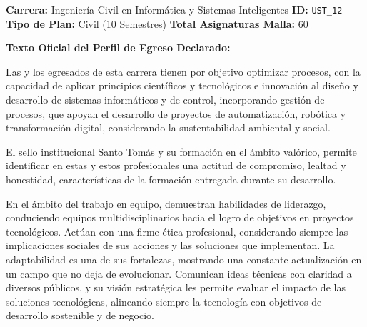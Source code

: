 \documentclass[11pt,a4paper]{article}
\begin{document}
\begin{tcolorbox}[fichaStyle, title={UNIVERSIDAD 12: Universidad Santo Tomás (UST)}]
\small\sffamily
\textbf{Carrera:} Ingeniería Civil en Informática y Sistemas Inteligentes \hfill \textbf{ID:} \texttt{UST\_12} \\
\textbf{Tipo de Plan:} Civil (10 Semestres) \hfill \textbf{Total Asignaturas Malla:} 60

\tcbline

\textbf{Texto Oficial del Perfil de Egreso Declarado:}\\[4pt]
{\small\rmfamily
Las y los egresados de esta carrera tienen por objetivo optimizar procesos, con la capacidad de aplicar principios científicos y tecnológicos e innovación al diseño y desarrollo de sistemas informáticos y de control, incorporando gestión de procesos, que apoyan el desarrollo de proyectos de automatización, robótica y transformación digital, considerando la sustentabilidad ambiental y social.

\vspace{4pt}
El sello institucional Santo Tomás y su formación en el ámbito valórico, permite identificar en estas y estos profesionales una actitud de compromiso, lealtad y honestidad, características de la formación entregada durante su desarrollo.

\vspace{4pt}
En el ámbito del trabajo en equipo, demuestran habilidades de liderazgo, conduciendo equipos multidisciplinarios hacia el logro de objetivos en proyectos tecnológicos. Actúan con una firme ética profesional, considerando siempre las implicaciones sociales de sus acciones y las soluciones que implementan. La adaptabilidad es una de sus fortalezas, mostrando una constante actualización en un campo que no deja de evolucionar. Comunican ideas técnicas con claridad a diversos públicos, y su visión estratégica les permite evaluar el impacto de las soluciones tecnológicas, alineando siempre la tecnología con objetivos de desarrollo sostenible y de negocio.
}
\end{tcolorbox}

\vspace{10pt}
\end{document}
